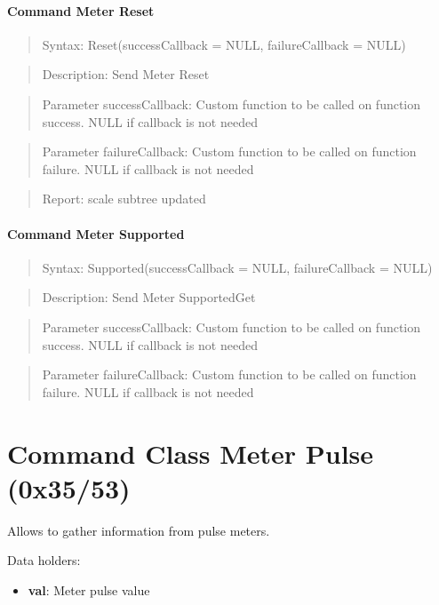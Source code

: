 \paragraph{Command Meter Reset}
\begin{quote}Syntax: Reset(successCallback = NULL, failureCallback = NULL)\end{quote}
\begin{quote}Description: Send Meter Reset\end{quote}
\begin{quote}Parameter successCallback: Custom function to be called on function success. NULL if callback is not needed\end{quote}
\begin{quote}Parameter failureCallback: Custom function to be called on function failure. NULL if callback is not needed\end{quote}
\begin{quote}Report: scale subtree updated\end{quote}

\paragraph{Command Meter Supported}
\begin{quote}Syntax: Supported(successCallback = NULL, failureCallback = NULL)\end{quote}
\begin{quote}Description: Send Meter SupportedGet\end{quote}
\begin{quote}Parameter successCallback: Custom function to be called on function success. NULL if callback is not needed\end{quote}
\begin{quote}Parameter failureCallback: Custom function to be called on function failure. NULL if callback is not needed\end{quote}



\section{Command Class Meter Pulse (0x35/53)}

Allows to gather information from pulse meters.
\newline

\noindent
Data holders:

\begin{itemize}
\item \textbf{val}: Meter pulse value
\end{itemize}


